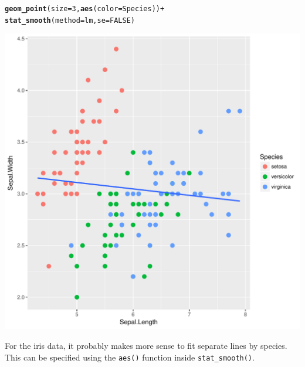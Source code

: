 \documentclass[12pt,oneside]{book}\usepackage[]{graphicx}\usepackage[]{color}
\makeatletter
\def\maxwidth{ %
  \ifdim\Gin@nat@width>\linewidth
    \linewidth
  \else
    \Gin@nat@width
  \fi
}
\newcommand{\hlnum}[1]{\textcolor[rgb]{0.686,0.059,0.569}{#1}}%
\newcommand{\hlopt}[1]{\textcolor[rgb]{0,0,0}{#1}}%
\newcommand{\hlstd}[1]{\textcolor[rgb]{0.345,0.345,0.345}{#1}}%
\newcommand{\hlkwc}[1]{\textcolor[rgb]{0.333,0.667,0.333}{#1}}%
\newcommand{\hlkwd}[1]{\textcolor[rgb]{0.737,0.353,0.396}{\textbf{#1}}}%
\newenvironment{kframe}{%
 \def\at@end@of@kframe{}%
 \ifinner\ifhmode%
  \def\at@end@of@kframe{\end{minipage}}%
  \begin{minipage}{\columnwidth}%
 \fi\fi%
 \def\FrameCommand##1{\hskip\@totalleftmargin \hskip-\fboxsep
 \colorbox{shadecolor}{##1}\hskip-\fboxsep
     \hskip-\linewidth \hskip-\@totalleftmargin \hskip\columnwidth}%
 \MakeFramed {\advance\hsize-\width
   \@totalleftmargin\z@ \linewidth\hsize
   \@setminipage}}%
 {\par\unskip\endMakeFramed%
 \at@end@of@kframe}
\newenvironment{knitrout}{}{} %
\makeatother
\begin{document}
\begin{knitrout}
\begin{kframe}
\begin{alltt}
    \hlkwd{geom_point}\hlstd{(}\hlkwc{size}\hlstd{=}\hlnum{3}\hlstd{,} \hlkwd{aes}\hlstd{(}\hlkwc{color}\hlstd{=Species))} \hlopt{+}
    \hlkwd{stat_smooth}\hlstd{(}\hlkwc{method} \hlstd{= lm,} \hlkwc{se}\hlstd{=}\hlnum{FALSE}\hlstd{)}
\end{alltt}
\end{kframe}
\includegraphics[width=\maxwidth]{figure/unnamed-chunk-65-2} 

\end{knitrout}
For the iris data, it probably makes more sense to fit separate lines by species. This can be specified using the \verb+aes()+ function inside \verb+stat_smooth()+. 
\end{document}
